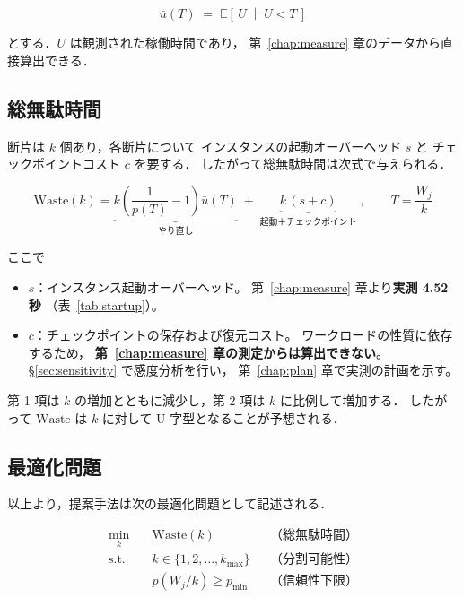 \documentclass[11pt,a4paper]{ltjsreport}
\newcommand{\E}{\mathbb{E}}
\newcommand{\Waste}{\mathrm{Waste}}
\begin{document}
\begin{equation}
\bar u(T) \;=\; \E\!\left[\,U \;\middle|\; U < T\,\right]
\label{eq:ubar}
\end{equation}

とする．$U$ は観測された稼働時間であり，
第~\ref{chap:measure} 章のデータから直接算出できる．

\subsection{総無駄時間}

断片は $k$ 個あり，各断片について
インスタンスの起動オーバーヘッド $s$ と
チェックポイントコスト $c$ を要する．
したがって総無駄時間は次式で与えられる．

\begin{equation}
\boxed{\;
\Waste(k)
=
\underbrace{k \left( \frac{1}{p(T)} - 1 \right) \bar u(T)}_{\text{やり直し}}
\;+\;
\underbrace{k\,(s + c)}_{\text{起動＋チェックポイント}}
\;,\qquad T = \frac{W_j}{k}
\;}
\label{eq:waste}
\end{equation}

ここで

\begin{itemize}
  \item $s$：インスタンス起動オーバーヘッド。
        第~\ref{chap:measure} 章より\textbf{実測 4.52 秒}
        （表~\ref{tab:startup}）。
  \item $c$：チェックポイントの保存および復元コスト。
        ワークロードの性質に依存するため，
        \textbf{第~\ref{chap:measure} 章の測定からは算出できない}。
        \S\ref{sec:sensitivity} で感度分析を行い，
        第~\ref{chap:plan} 章で実測の計画を示す。
\end{itemize}

第 1 項は $k$ の増加とともに減少し，第 2 項は $k$ に比例して増加する．
したがって $\Waste$ は $k$ に対して U 字型となることが予想される．

\subsection{最適化問題}

以上より，提案手法は次の最適化問題として記述される．

\begin{equation}
\begin{aligned}
\min_{k}\quad
  & \Waste(k) && \text{（総無駄時間）} \\[3pt]
\text{s.t.}\quad
  & k \in \{1, 2, \ldots, k_{\max}\}   && \text{（分割可能性）} \\[2pt]
  & p(W_j/k) \geq p_{\min}             && \text{（信頼性下限）}
\end{aligned}
\label{eq:opt}
\end{equation}
\end{document}
